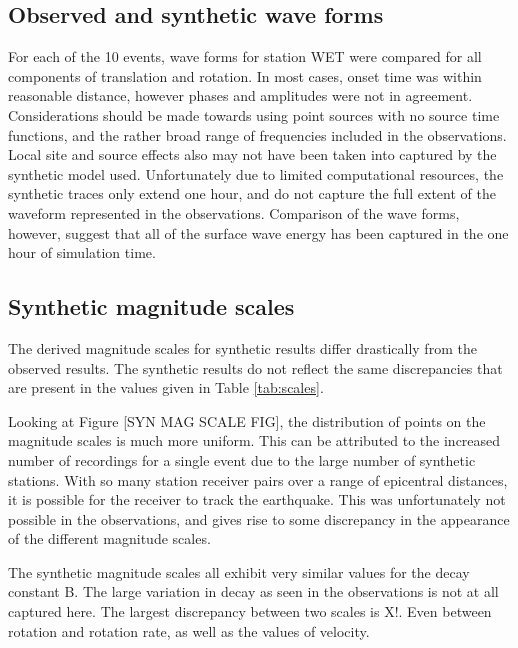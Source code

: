\documentclass{gji}
\begin{document}
\subsection{Observed and synthetic wave forms}
For each of the 10 events, wave forms for station WET were compared for all components of translation and rotation. In most cases, onset time was within reasonable distance, however phases and amplitudes were not in agreement. Considerations should be made towards using point sources with no source time functions, %
and the rather broad range of frequencies included in the observations. Local site and source effects also may not have been taken into captured by the synthetic model used. Unfortunately due to limited computational resources, the synthetic traces only extend one hour, and do not capture the full extent of the waveform represented in the observations. Comparison of the wave forms, however, suggest that all of the surface wave energy has been captured in the one hour of simulation time. %



\subsection{Synthetic magnitude scales}
The derived magnitude scales for synthetic results differ drastically from the observed results. The synthetic results  do not reflect the same discrepancies that are present in the values given in Table \ref{tab:scales}.

Looking at Figure [SYN MAG SCALE FIG], the distribution of points on the magnitude scales is much more uniform. This can be attributed to the increased number of recordings for a single event due to the large number of synthetic stations. With so many station receiver pairs over a range of epicentral distances, it is possible for the receiver to track the earthquake. This was unfortunately not possible in the observations, and gives rise to some discrepancy in the appearance of the different magnitude scales. 

The synthetic magnitude scales all exhibit very similar values for the decay constant B. The large variation in decay as seen in the observations is not at all captured here. The largest discrepancy between two scales is X!. Even between rotation and rotation rate, as well as the values of velocity.
\end{document}
